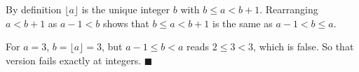By definition $\lfloor a\rfloor$ is the unique integer $b$ with $b\le a<b+1$. Rearranging $a<b+1$ as $a-1<b$ shows that $b\le a<b+1$ is the same as $a-1<b\le a$.

For $a=3$, $b=\lfloor a\rfloor=3$, but $a-1\le b<a$ reads $2\le3<3$, which is false. So that version fails exactly at integers. $\blacksquare$
